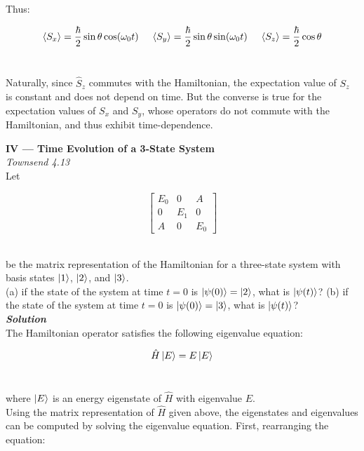 \documentclass[14pt]{extarticle}
\newcommand{\bfit}[1]{\textbf{\textit{#1}}}
\begin{document}
Thus:

$$\langle S_x \rangle = \frac \hbar 2 \sin\theta \cos(\omega_0 t) \hspace{0.5cm} \langle S_y \rangle = \frac \hbar 2 \sin\theta \sin(\omega_0t) \hspace{0.5cm} \langle S_z \rangle = \frac \hbar 2 \cos\theta$$ \ 

Naturally, since $\hat S_z$ commutes with the Hamiltonian, the expectation value of $S_z$ is constant and does not depend on time. But the converse is true for the expectation values of $S_x$ and $S_y$, whose operators do not commute with the Hamiltonian, and thus exhibit time-dependence. \\  








\hrulefill 

\hfill 

{\bf \LARGE IV --- Time Evolution of a 3-State System} \\ 

{\it Townsend 4.13} \\ 

Let

$$
\begin{bmatrix}
	E_0 & 0 & A \\ 
	0 & E_1 & 0 \\ 
	A & 0 & E_0
\end{bmatrix}
$$ \ 

be the matrix representation of the Hamiltonian for a three-state system with basis states $\ket{1}$, $\ket{2}$, and $\ket{3}$. \\ 

(a) if the state of the system at time $t=0$ is $\ket{\psi(0)} = \ket{2}$, what is $\ket{\psi(t)}$? (b) if the state of the system at time $t=0$ is $\ket{\psi(0)} = \ket{3}$, what is $\ket{\psi(t)}$? \\ 


{\bfit{Solution}} \\ 
The Hamiltonian operator satisfies the following eigenvalue equation: 

$$\hat H \ket E = E \ket E$$ \ 

where $\ket E$ is an energy eigenstate of $\hat H$ with eigenvalue $E$. \\ 

Using the matrix representation of $\hat H$ given above, the eigenstates and eigenvalues can be computed by solving the eigenvalue equation. First, rearranging the equation:
\end{document}
